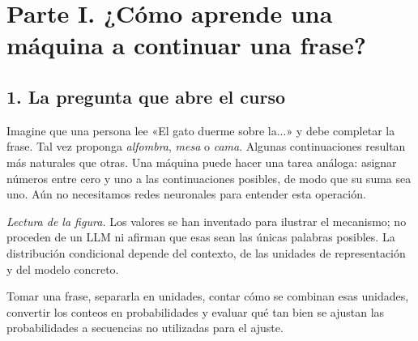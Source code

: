 \chapter*{Parte I. ¿Cómo aprende una máquina a continuar una frase?}
\section*{1. La pregunta que abre el curso}
Imagine que una persona lee «El gato duerme sobre la...» y debe completar la frase. Tal vez proponga \emph{alfombra}, \emph{mesa} o \emph{cama}. Algunas continuaciones resultan más naturales que otras. Una máquina puede hacer una tarea análoga: asignar números entre cero y uno a las continuaciones posibles, de modo que su suma sea uno. Aún no necesitamos redes neuronales para entender esta operación.

\begin{center}
\end{center}
\noindent\textit{Lectura de la figura.} Los valores se han inventado para ilustrar el mecanismo; no proceden de un LLM ni afirman que esas sean las únicas palabras posibles. La distribución condicional depende del contexto, de las unidades de representación y del modelo concreto.

\begin{idea}
Tomar una frase, separarla en unidades, contar cómo se combinan esas unidades, convertir los conteos en probabilidades y evaluar qué tan bien se ajustan las probabilidades a secuencias no utilizadas para el ajuste.
\end{idea}

